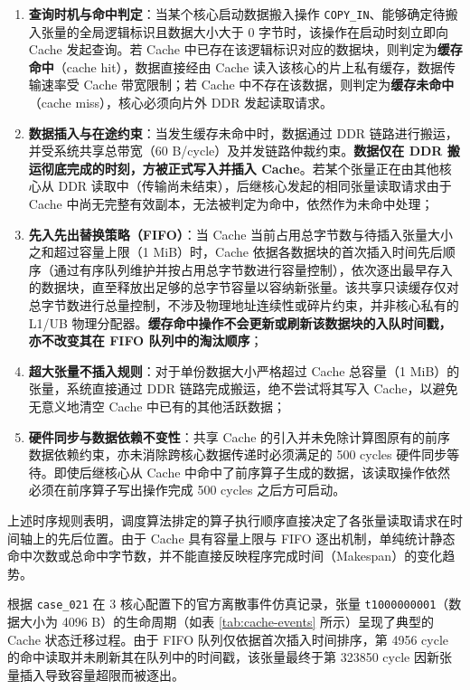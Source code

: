 \documentclass[anonymous,withtoc]{gmcm2026}
\providecommand{\tightlist}{\setlength{\itemsep}{0pt}\setlength{\parskip}{0pt}}
\begin{document}
\begin{enumerate}
\def\labelenumi{\arabic{enumi}.}
\tightlist
\item
  \textbf{查询时机与命中判定}：当某个核心启动数据搬入操作 \texttt{COPY\_IN}、能够确定待搬入张量的全局逻辑标识且数据大小大于 0 字节时，该操作在启动时刻立即向 Cache 发起查询。若 Cache 中已存在该逻辑标识对应的数据块，则判定为\textbf{缓存命中}（cache hit），数据直接经由 Cache 读入该核心的片上私有缓存，数据传输速率受 Cache 带宽限制；若 Cache 中不存在该数据，则判定为\textbf{缓存未命中}（cache miss），核心必须向片外 DDR 发起读取请求。
\item
  \textbf{数据插入与在途约束}：当发生缓存未命中时，数据通过 DDR 链路进行搬运，并受系统共享总带宽（60 B/cycle）及并发链路仲裁约束。\textbf{数据仅在 DDR 搬运彻底完成的时刻，方被正式写入并插入 Cache}。若某个张量正在由其他核心从 DDR 读取中（传输尚未结束），后继核心发起的相同张量读取请求由于 Cache 中尚无完整有效副本，无法被判定为命中，依然作为未命中处理；
\item
  \textbf{先入先出替换策略（FIFO）}：当 Cache 当前占用总字节数与待插入张量大小之和超过容量上限（1 MiB）时，Cache 依据各数据块的首次插入时间先后顺序（通过有序队列维护并按占用总字节数进行容量控制），依次逐出最早存入的数据块，直至释放出足够的总字节容量以容纳新张量。该共享只读缓存仅对总字节数进行总量控制，不涉及物理地址连续性或碎片约束，并非核心私有的 L1/UB 物理分配器。\textbf{缓存命中操作不会更新或刷新该数据块的入队时间戳，亦不改变其在 FIFO 队列中的淘汰顺序}；
\item
  \textbf{超大张量不插入规则}：对于单份数据大小严格超过 Cache 总容量（1 MiB）的张量，系统直接通过 DDR 链路完成搬运，绝不尝试将其写入 Cache，以避免无意义地清空 Cache 中已有的其他活跃数据；
\item
  \textbf{硬件同步与数据依赖不变性}：共享 Cache 的引入并未免除计算图原有的前序数据依赖约束，亦未消除跨核心数据传递时必须满足的 500 cycles 硬件同步等待。即使后继核心从 Cache 中命中了前序算子生成的数据，该读取操作依然必须在前序算子写出操作完成 500 cycles 之后方可启动。
\end{enumerate}

上述时序规则表明，调度算法排定的算子执行顺序直接决定了各张量读取请求在时间轴上的先后位置。由于 Cache 具有容量上限与 FIFO 逐出机制，单纯统计静态命中次数或总命中字节数，并不能直接反映程序完成时间（Makespan）的变化趋势。

根据 \texttt{case\_021} 在 3 核心配置下的官方离散事件仿真记录，张量 \texttt{t1000000001}（数据大小为 4096 B）的生命周期（如表 \ref{tab:cache-events} 所示）呈现了典型的 Cache 状态迁移过程。由于 FIFO 队列仅依据首次插入时间排序，第 4956 cycle 的命中读取并未刷新其在队列中的时间戳，该张量最终于第 323850 cycle 因新张量插入导致容量超限而被逐出。
\end{document}
